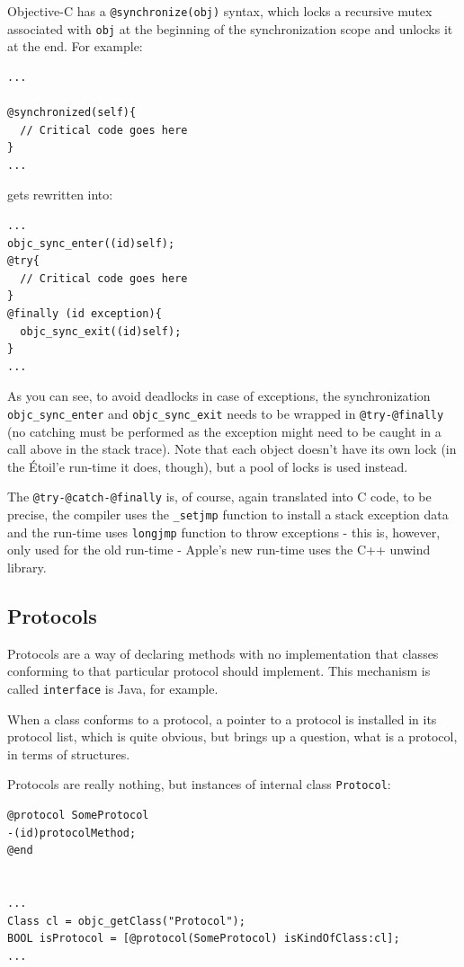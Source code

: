Objective-C has a \verb=@synchronize(obj)= syntax, which locks a recursive mutex associated with \verb=obj= at the beginning of the synchronization scope and unlocks it at the end. For example:

\begin{verbatim}
...

@synchronized(self){
  // Critical code goes here
}
...
\end{verbatim}

gets rewritten into:

\begin{verbatim}
...
objc_sync_enter((id)self);
@try{
  // Critical code goes here
}
@finally (id exception){
  objc_sync_exit((id)self);
}
...
\end{verbatim}

As you can see, to avoid deadlocks in case of exceptions, the synchronization \verb=objc_sync_enter= and \verb=objc_sync_exit= needs to be wrapped in \verb=@try-@finally= (no catching must be performed as the exception might need to be caught in a call above in the stack trace). Note that each object doesn't have its own lock (in the \'Etoil'e run-time it does, though), but a pool of locks is used instead.

The \verb=@try-@catch-@finally= is, of course, again translated into C code, to be precise, the compiler uses the \verb=_setjmp= function to install a stack exception data and the run-time uses \verb=longjmp= function to throw exceptions - this is, however, only used for the old run-time - Apple's new run-time uses the C++ unwind library.

\subsection{Protocols}

Protocols are a way of declaring methods with no implementation that classes conforming to that particular protocol should implement. This mechanism is called \verb=interface= is Java, for example.

When a class conforms to a protocol, a pointer to a protocol is installed in its protocol list, which is quite obvious, but brings up a question, what is a protocol, in terms of structures.

Protocols are really nothing, but instances of internal class \verb=Protocol=:

\begin{verbatim}
@protocol SomeProtocol
-(id)protocolMethod;
@end


...
Class cl = objc_getClass("Protocol");
BOOL isProtocol = [@protocol(SomeProtocol) isKindOfClass:cl];
...
\end{verbatim}

